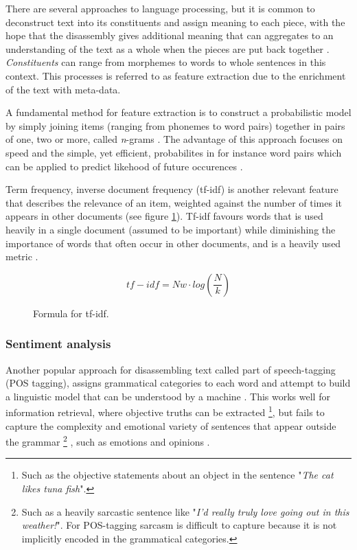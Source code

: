 \documentclass[a4paper]{article}
\begin{document}
There are several approaches to language processing, but it is common
to deconstruct text into its constituents and assign meaning
to each piece, with the hope that the disassembly gives additional meaning
that can aggregates to an understanding of the text as a whole when the pieces
are put back together \citep{Jurafsky2000}.
\textit{Constituents} can range from morphemes to words to whole sentences in
this context. This processes is referred to as feature extraction due to the
enrichment of the text with meta-data.

A fundamental method for feature extraction is to construct a probabilistic
model by simply joining items (ranging from phonemes to word pairs) together
in pairs of one, two or more, called \textit{n}-grams \citep{Jurafsky2000}.
The advantage of this approach focuses on speed and the simple, yet efficient,
probabilites in for instance word pairs which can be applied to predict
likehood of future occurences \citep{Jurafsky2000}.

Term frequency, inverse document frequency (tf-idf) is another relevant feature
that describes the relevance of an item, weighted against the number of
times it appears in other documents \citep{Jurafsky2000} (see figure \ref{fig:tfidf}).
Tf-idf favours words that is used heavily in a
single document (assumed to be important) while diminishing the importance of
words that often occur in other documents, and is a heavily used metric \citep{Jurafsky2000}.

\begin{figure}
\[tf-idf = Nw \cdot log(\frac{N}{k})\]
\caption{Formula for tf-idf.}
\label{fig:tfidf}
\end{figure}

\subsubsection{Sentiment analysis}
Another popular approach for disassembling text
called part of speech-tagging (POS tagging), assigns grammatical categories
to each word and attempt to build a linguistic model that can be understood by
a machine \citep{Jurafsky2000}. This works well for information retrieval,
where objective truths can be extracted
\footnote{Such as the objective statements about an object in the
sentence "\textit{The cat likes tuna fish}".}, but fails
to capture the complexity and emotional variety of sentences that appear
outside the grammar
\footnote{Such as a heavily sarcastic sentence like
"\textit{I'd really truly love going out in this weather!}". For POS-tagging
sarcasm is difficult to capture because it is not implicitly encoded in the
grammatical categories.}
, such as emotions and opinions \citep{Jurafsky2000}.
\end{document}
